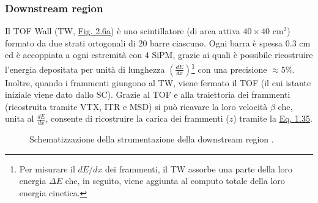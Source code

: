 \documentclass[12pt,a4paper,twoside]{report}
\begin{document}
	\subsubsection{Downstream region}\label{par:downstream_region}
	Il TOF Wall (TW, \hyperref[fig:tw]{Fig. 2.6a}) è uno scintillatore (di area attiva $40\times40\mbox{ cm}^2$) formato da due strati ortogonali di $20$ barre ciascuno. Ogni barra è spessa $0.3\mbox{ cm}$ ed è accoppiata a ogni estremità con $4$ SiPM, grazie ai quali è possibile ricostruire l'energia depositata per unità di lunghezza $\left(\frac{dE}{dx}\right)$\footnote{Per misurare il $dE/dx$ dei frammenti, il TW assorbe una parte della loro energia $\Delta E$ che, in seguito, viene aggiunta al computo totale della loro energia cinetica.} con una precisione $\approx5\%$. Inoltre, quando i frammenti giungono al TW, viene fermato il TOF (il cui istante iniziale viene dato dallo SC). Grazie al TOF e alla traiettoria dei frammenti (ricostruita tramite VTX, ITR e MSD) si può ricavare la loro velocità $\beta$ che, unita al $\frac{dE}{dx}$, consente di ricostruire la carica dei frammenti ($z$) tramite la \hyperref[eq:bethe_bloch]{Eq. 1.35}.
	\begin{figure}[H]
		\centering
		\hfill
		\par
		\caption{Schematizzazione della strumentazione della downstream region \cite{slide_spighi}.}
	\end{figure}
\end{document}
